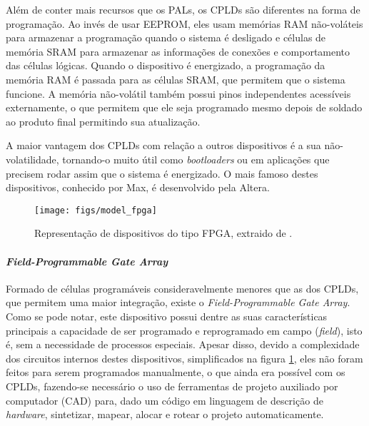 \documentclass[11pt,a4paper,oneside]{book}
\begin{document}
Al\'em de conter mais recursos que os PALs, os CPLDs s\~ao diferentes na forma de programa\c{c}\~ao.
Ao inv\'es de usar EEPROM, eles usam mem\'orias RAM n\~ao-vol\'ateis para armazenar a programa\c{c}\~ao quando o sistema \'e desligado e c\'elulas de mem\'oria SRAM para armazenar as informa\c{c}\~oes de conex\~oes e comportamento das c\'elulas l\'ogicas.
Quando o dispositivo \'e energizado, a programa\c{c}\~ao da mem\'oria RAM \'e passada para as c\'elulas SRAM, que permitem que o sistema funcione.
A mem\'oria n\~ao-vol\'atil tamb\'em possui pinos independentes acess\'i­veis externamente, o que permitem que ele seja programado mesmo depois de soldado ao produto final permitindo sua atualiza\c{c}\~ao.

A maior vantagem dos CPLDs com rela\c{c}\~ao a outros dispositivos \'e a sua n\~ao-volatilidade, tornando-o muito \'util como \textit{bootloaders} ou em aplica\c{c}\~oes que precisem rodar assim que o sistema \'e energizado.
O mais famoso destes dispositivos, conhecido por Max, \'e desenvolvido pela Altera.

\begin{figure}[h]
\centering
\texttt{[image: figs/model\_fpga]}
\caption{Representa\c{c}\~ao de dispositivos do tipo FPGA, extraido de \cite{Ashenden2008}.}
\label{fig:fpga}
\end{figure}

\paragraph{\textit{Field-Programmable Gate Array}}
Formado de c\'elulas program\'aveis consideravelmente menores que as dos CPLDs, que permitem uma maior integra\c{c}\~ao, existe o \textit{Field-Programmable Gate Array}.
Como se pode notar, este dispositivo possui dentre as suas caracter\'i­sticas principais a capacidade de ser programado e reprogramado em campo (\textit{field}), isto \'e, sem a necessidade de processos especiais.
Apesar disso, devido a complexidade dos circuitos internos destes dispositivos, simplificados na figura \ref{fig:fpga}, eles n\~ao foram feitos para serem programados manualmente, o que ainda era poss\'i­vel com os CPLDs, fazendo-se necess\'ario o uso de ferramentas de projeto auxiliado por computador (CAD) para, dado um c\'odigo em linguagem de descri\c{c}\~ao de \textit{hardware}, sintetizar, mapear, alocar e rotear o projeto automaticamente.
\end{document}

